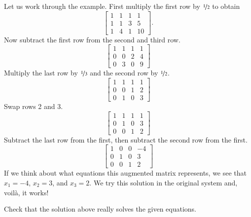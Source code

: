 \documentclass[12pt]{book}
\begin{document}
Let us work through the example.  First multiply the first row by
$\nicefrac{1}{2}$ to obtain
\begin{equation*}
\left[
\begin{array}{ccc|c}
1 & 1 & 1 & 1 \\
1 & 1 & 3 & 5 \\
1 & 4 & 1 & 10
\end{array}
\right] .
\end{equation*}
Now subtract the first row from the second and third row.
\begin{equation*}
\left[
\begin{array}{ccc|c}
1 & 1 & 1 & 1 \\
0 & 0 & 2 & 4 \\
0 & 3 & 0 & 9
\end{array}
\right]
\end{equation*}
Multiply the last row by $\nicefrac{1}{3}$ and the second row by $\nicefrac{1}{2}$.
\begin{equation*}
\left[
\begin{array}{ccc|c}
1 & 1 & 1 & 1 \\
0 & 0 & 1 & 2 \\
0 & 1 & 0 & 3
\end{array}
\right]
\end{equation*}
Swap rows 2 and 3.
\begin{equation*}
\left[
\begin{array}{ccc|c}
1 & 1 & 1 & 1 \\
0 & 1 & 0 & 3 \\
0 & 0 & 1 & 2
\end{array}
\right]
\end{equation*}
Subtract the last row from the first, then subtract the second row
from the first.
\begin{equation*}
\left[
\begin{array}{ccc|c}
1 & 0 & 0 & -4 \\
0 & 1 & 0 & 3 \\
0 & 0 & 1 & 2
\end{array}
\right]
\end{equation*}
If we think about what equations this augmented matrix represents, we see that
$x_1 = -4$, $x_2 = 3$, and $x_3 = 2$.  We try this solution in the original
system and, voil\`a, it works!

\begin{exercise}
Check that the solution above really solves the given equations.
\end{exercise}
\end{document}
